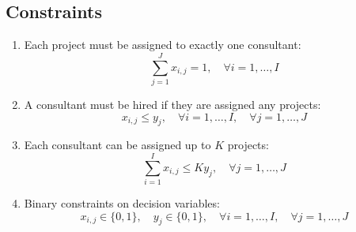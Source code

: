 \documentclass{article}
\begin{document}
\subsection*{Constraints}
\begin{enumerate}
    \item Each project must be assigned to exactly one consultant:
    \[
    \sum_{j=1}^{J} x_{i,j} = 1, \quad \forall i = 1, \ldots, I
    \]
    
    \item A consultant must be hired if they are assigned any projects:
    \[
    x_{i,j} \leq y_j, \quad \forall i = 1, \ldots, I, \quad \forall j = 1, \ldots, J
    \]
    
    \item Each consultant can be assigned up to \( K \) projects:
    \[
    \sum_{i=1}^{I} x_{i,j} \leq K y_j, \quad \forall j = 1, \ldots, J
    \]
    
    \item Binary constraints on decision variables:
    \[
    x_{i,j} \in \{0, 1\}, \quad y_j \in \{0, 1\}, \quad \forall i = 1, \ldots, I, \quad \forall j = 1, \ldots, J
    \]
\end{enumerate}
\end{document}

